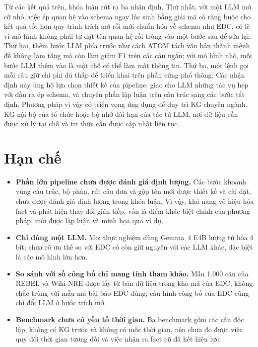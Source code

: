 Từ các kết quả trên, khóa luận rút ra ba nhận định.
Thứ nhất, với một LLM mở cỡ nhỏ, việc ép quan hệ vào schema ngay lúc sinh bằng giải mã có ràng buộc
cho kết quả tốt hơn quy trình trích mở rồi mới chuẩn hóa về schema như EDC,
có lẽ vì mô hình không phải tự đặt tên quan hệ rồi trông vào một bước sau để sửa lại.
Thứ hai, thêm bước LLM phía trước như cách ATOM tách văn bản thành mệnh đề không làm tăng mà còn làm giảm F1 trên các câu ngắn;
với mô hình nhỏ, mỗi bước LLM thêm vào là một chỗ có thể làm mất thông tin.
Thứ ba, một lệnh gọi mỗi câu giữ chi phí đủ thấp để triển khai trên phần cứng phổ thông.
Các nhận định này ủng hộ lựa chọn thiết kế của pipeline:
giao cho LLM những tác vụ hẹp với đầu ra ép schema,
và chuyển phần lập luận trên cấu trúc sang các bước tất định.
Phương pháp vì vậy có triển vọng ứng dụng để duy trì KG chuyên ngành, KG nội bộ của tổ chức
hoặc bộ nhớ dài hạn của tác tử LLM, nơi dữ liệu cần được xử lý tại chỗ và tri thức cần được cập nhật liên tục.

\section{Hạn chế}
\label{sec:conclusion-limits}

\begin{itemize}
  \item \textbf{Phần lớn pipeline chưa được đánh giá định lượng.}
  Các bước khoanh vùng cấu trúc, bộ phán, rút câu đơn và gộp tên mới được thiết kế và cài đặt,
  chưa được đánh giá định lượng trong khóa luận.
  Vì vậy, khả năng vô hiệu hóa fact và phát hiện thay đổi gián tiếp,
  vốn là điểm khác biệt chính của phương pháp, mới được lập luận và minh họa qua ví dụ.

  \item \textbf{Chỉ dùng một LLM.}
  Mọi thực nghiệm dùng Gemma~4 E4B lượng tử hóa 4 bit;
  chưa rõ ưu thế so với EDC có còn giữ nguyên với các LLM khác, đặc biệt là các mô hình lớn hơn.

  \item \textbf{So sánh với số công bố chỉ mang tính tham khảo.}
  Mẫu 1.000 câu của REBEL và Wiki-NRE được lấy từ bản dữ liệu trong kho mã của EDC,
  không chắc trùng với mẫu mà bài báo EDC dùng;
  cấu hình công bố của EDC cũng chỉ đổi LLM ở bước trích mở.

  \item \textbf{Benchmark chưa có yếu tố thời gian.}
  Ba benchmark gồm các câu độc lập, không có KG trước và không có mốc thời gian,
  nên chưa đo được việc quy đổi thời gian tương đối và việc nhận ra fact cũ đã hết hiệu lực.
\end{itemize}

